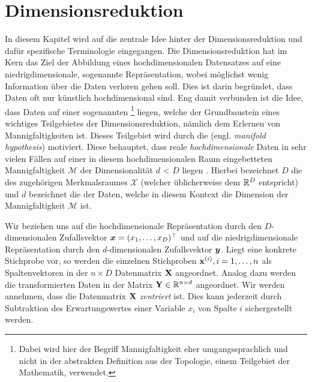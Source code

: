 \chapter{Dimensionsreduktion}
\label{ch:Dimensionsreduktion}

In diesem Kapitel wird auf die zentrale Idee hinter der Dimensionsreduktion und dafür spezifische
Terminologie eingegangen. Die Dimensionsreduktion hat im Kern das Ziel der Abbildung eines
hochdimensionalen Datensatzes auf eine niedrigdimensionale, sogenannte 
Repräsentation, wobei möglichst wenig Information über die Daten verloren gehen soll. Dies ist
darin begründet, dass Daten oft nur künstlich hochdimensional sind. Eng damit verbunden ist die
Idee, dass Daten auf einer sogenannten \footnote{Dabei wird hier der
	Begriff Mannigfaltigkeit eher umgangssprachlich und nicht in der abstrakten Definition aus der
	Topologie, einem Teilgebiet der Mathematik, verwendet.} liegen, welche der Grundbaustein eines
wichtiges Teilgebietes der Dimensionsreduktion, nämlich dem Erlernen von Mannigfaltigkeiten \parencite{Cayton.2005} ist. Dieses Teilgebiet wird durch die 
(engl. \textit{manifold hypothesis}) motiviert. Diese behauptet, dass reale
\textit{hochdimensionale} Daten in sehr vielen Fällen auf einer in diesem hochdimensionalen Raum
eingebetteten Mannigfaltigkeit $\mathcal{M}$ der Dimensionalität $d$ < $D$ liegen \parencite[vgl.][1]{Cayton.2005}.  Hierbei
bezeichnet $D$ die  des zugehörigen Merkmalsraumes $\mathcal{X}$
(welcher üblicherweise dem $\mathbb{R}^D$ entspricht) und $d$ bezeichnet die  der Daten, welche in diesem Kontext die Dimension der Mannigfaltigkeit $\mathcal{M}$
ist.

Wir beziehen uns auf die hochdimensionale Repräsentation durch den $D$-dimensionalen Zufallsvektor
$\bm{x} = (x_1, \ldots, x_D)^\top$ und auf die niedrigdimensionale Repräsentation
durch den $d$-dimensionalen Zufallsvektor $\bm{y}$. Liegt eine konkrete Stichprobe vor, so
werden die einzelnen Stichproben $\mathbf{x}^{(i)}, i = 1,\ldots,n$ als Spaltenvektoren in der $n
	\times D$ Datenmatrix $\mathbf{X}$ angeordnet. Analog dazu werden die transformierten Daten in der
Matrix $\mathbf{Y} \in \mathbb{R}^{n \times d}$ angeordnet. Wir werden annehmen, dass die Datenmatrix
$\mathbf{X}$ \textit{zentriert} ist. Dies kann jederzeit durch Subtraktion des Erwartungswertes einer
Variable $x_i$ von Spalte $i$ sichergestellt werden.


